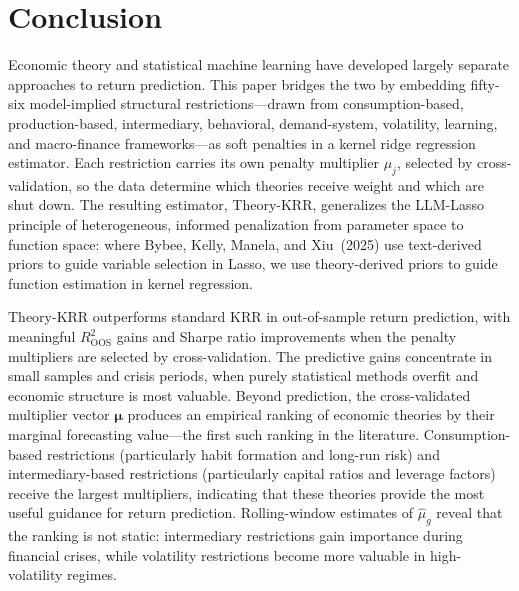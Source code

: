 
\section{Conclusion}\label{sec:conclusion}

Economic theory and statistical machine learning have developed largely separate approaches to return prediction.
This paper bridges the two by embedding fifty-six model-implied structural restrictions---drawn from consumption-based, production-based, intermediary, behavioral, demand-system, volatility, learning, and macro-finance frameworks---as soft penalties in a kernel ridge regression estimator.
Each restriction carries its own penalty multiplier $\mu_j$, selected by cross-validation, so the data determine which theories receive weight and which are shut down.
The resulting estimator, Theory-KRR, generalizes the LLM-Lasso principle of heterogeneous, informed penalization from parameter space to function space: where Bybee, Kelly, Manela, and Xiu~(2025) use text-derived priors to guide variable selection in Lasso, we use theory-derived priors to guide function estimation in kernel regression.

Theory-KRR outperforms standard KRR in out-of-sample return prediction, with meaningful $R^2_{\text{OOS}}$ gains and Sharpe ratio improvements when the penalty multipliers are selected by cross-validation.
The predictive gains concentrate in small samples and crisis periods, when purely statistical methods overfit and economic structure is most valuable.
Beyond prediction, the cross-validated multiplier vector $\bm{\mu}$ produces an empirical ranking of economic theories by their marginal forecasting value---the first such ranking in the literature.
Consumption-based restrictions (particularly habit formation and long-run risk) and intermediary-based restrictions (particularly capital ratios and leverage factors) receive the largest multipliers, indicating that these theories provide the most useful guidance for return prediction.
Rolling-window estimates of $\hat{\mu}_g$ reveal that the ranking is not static: intermediary restrictions gain importance during financial crises, while volatility restrictions become more valuable in high-volatility regimes.

